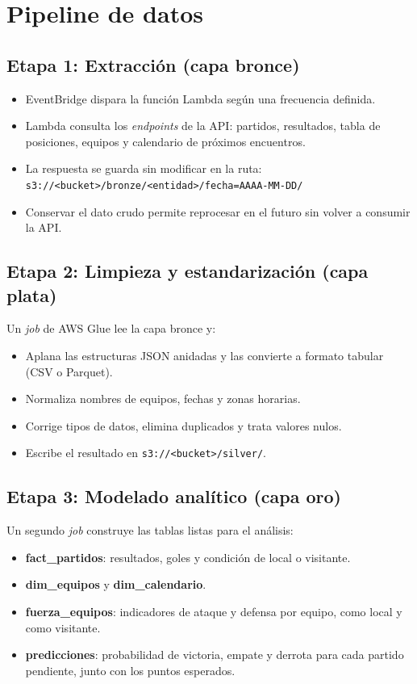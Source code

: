 \documentclass[11pt,a4paper]{article}
\begin{document}
\section{Pipeline de datos}

\subsection{Etapa 1: Extracción (capa bronce)}
\begin{itemize}
  \item EventBridge dispara la función Lambda según una frecuencia definida.
  \item Lambda consulta los \textit{endpoints} de la API: partidos, resultados, tabla de posiciones, equipos y calendario de próximos encuentros.
  \item La respuesta se guarda sin modificar en la ruta:\\ \texttt{s3://<bucket>/bronze/<entidad>/fecha=AAAA-MM-DD/}
  \item Conservar el dato crudo permite reprocesar en el futuro sin volver a consumir la API.
\end{itemize}

\subsection{Etapa 2: Limpieza y estandarización (capa plata)}
Un \textit{job} de AWS Glue lee la capa bronce y:
\begin{itemize}
  \item Aplana las estructuras JSON anidadas y las convierte a formato tabular (CSV o Parquet).
  \item Normaliza nombres de equipos, fechas y zonas horarias.
  \item Corrige tipos de datos, elimina duplicados y trata valores nulos.
  \item Escribe el resultado en \texttt{s3://<bucket>/silver/}.
\end{itemize}

\subsection{Etapa 3: Modelado analítico (capa oro)}
Un segundo \textit{job} construye las tablas listas para el análisis:
\begin{itemize}
  \item \textbf{fact\_partidos}: resultados, goles y condición de local o visitante.
  \item \textbf{dim\_equipos} y \textbf{dim\_calendario}.
  \item \textbf{fuerza\_equipos}: indicadores de ataque y defensa por equipo, como local y como visitante.
  \item \textbf{predicciones}: probabilidad de victoria, empate y derrota para cada partido pendiente, junto con los puntos esperados.
\end{itemize}
\end{document}
